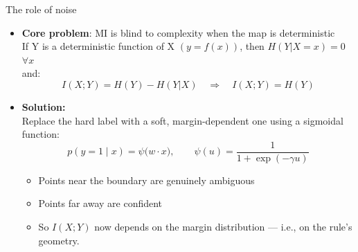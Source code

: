
\begin{frame}{The role of noise}
\begin{itemize}
    \item \textbf{Core problem}:
    MI is blind to complexity when the map is deterministic \\ 
    If Y is a deterministic function of X $(y=f(x))$, then $H(Y|X=x)= 0$ $\forall x$ \\ and:
    $$I(X;Y)=H(Y) - H(Y|X) \quad \Rightarrow \quad I(X;Y) = H(Y)$$  
    \item \textbf{Solution:} \\
    Replace the hard label with a soft, margin-dependent one using a sigmoidal function:
    $$ p(y=1\mid x) = \psi\big(w \cdot x), \qquad \psi(u) = \frac{1}{1+\exp(-\gamma u)}$$
    \begin{itemize}
        \item Points near the boundary are genuinely ambiguous
        \item Points far away are confident
        \item So $I(X;Y)$ now depends on the margin distribution — i.e., on the rule's geometry.
    \end{itemize}
\end{itemize}

\end{frame}


